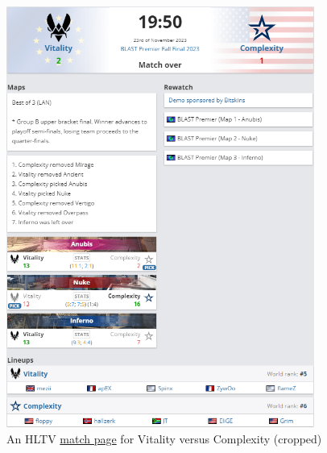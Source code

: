 \begin{figure}[h]
	\centering
	\includegraphics[width=0.9\textwidth]{Figures/hltv/match-cropped-3.png}
	\caption{An HLTV \href{https://www.hltv.org/matches/2368036/vitality-vs-complexity-blast-premier-fall-final-2023}{match page} for Vitality versus Complexity (cropped)}
	\label{fig:match_cropped}
\end{figure}

